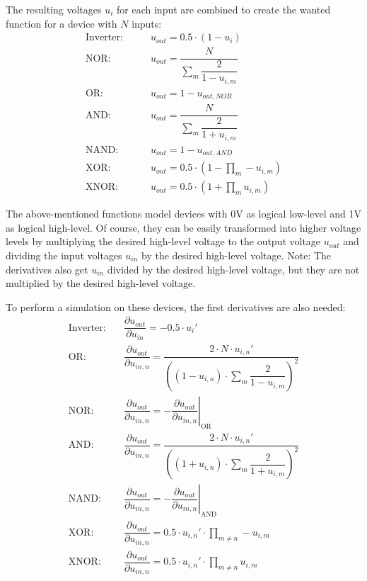 The resulting voltages $u_i$ for each input are combined to create
the wanted function for a device with $N$ inputs:
\begin{align}
\label{eq:logout1}
\text{Inverter:} \qquad & u_{out} = 0.5\cdot(1 - u_i) \\
\text{NOR:}      \qquad & u_{out} = \dfrac{N}{\sum\limits_m \dfrac{2}{1 - u_{i,m}}} \\
\text{OR:}       \qquad & u_{out} = 1 - u_{out,NOR} \\
\text{AND:}      \qquad & u_{out} = \dfrac{N}{\sum\limits_m \dfrac{2}{1 + u_{i,m}}} \\
\text{NAND:}     \qquad & u_{out} = 1 - u_{out,AND} \\
\text{XOR:}      \qquad & u_{out} = 0.5\cdot\left( 1 - \prod_m -u_{i,m} \right) \\
\label{eq:logout2}
\text{XNOR:}     \qquad & u_{out} = 0.5\cdot\left( 1 + \prod_m u_{i,m} \right)
\end{align}

The above-mentioned functions model devices with 0V as logical
low-level and 1V as logical high-level.  Of course, they can be easily
transformed into higher voltage levels by multiplying the desired
high-level voltage to the output voltage $u_{out}$ and dividing the
input voltages $u_{in}$ by the desired high-level voltage.  Note: The
derivatives also get $u_{in}$ divided by the desired high-level
voltage, but they are not multiplied by the desired high-level
voltage.

\addvspace{12pt}

To perform a simulation on these devices, the first derivatives are also
needed:
\begin{align}
\text{Inverter:} \quad & \dfrac{\partial u_{out}}{\partial u_{in}}
        =  -0.5\cdot u_i' \\
\text{OR:} \quad & \dfrac{\partial u_{out}}{\partial u_{in,n}}
  = \dfrac{2\cdot N\cdot u_{i,n}'}{\left( (1-u_{i,n})\cdot\sum\limits_m \dfrac{2}{1-u_{i,m}} \right)^2} \\
\text{NOR:} \quad & \dfrac{\partial u_{out}}{\partial u_{in,n}}
  = - \left.\dfrac{\partial u_{out}}{\partial u_{in,n}}\right|_{\text{OR}} \\
\text{AND:} \quad & \dfrac{\partial u_{out}}{\partial u_{in,n}}
  = \dfrac{2\cdot N\cdot u_{i,n}'}{\left( (1+u_{i,n})\cdot\sum\limits_m \dfrac{2}{1+u_{i,m}} \right)^2} \\
\text{NAND:} \quad & \dfrac{\partial u_{out}}{\partial u_{in,n}}
  = - \left.\dfrac{\partial u_{out}}{\partial u_{in,n}}\right|_{\text{AND}} \\
\text{XOR:} \quad & \dfrac{\partial u_{out}}{\partial u_{in,n}}
  = 0.5\cdot u_{i,n}' \cdot\prod_{m\ne n} -u_{i,m} \\
\text{XNOR:} \quad & \dfrac{\partial u_{out}}{\partial u_{in,n}}
  = 0.5\cdot u_{i,n}' \cdot\prod_{m\ne n} u_{i,m}
\end{align}

